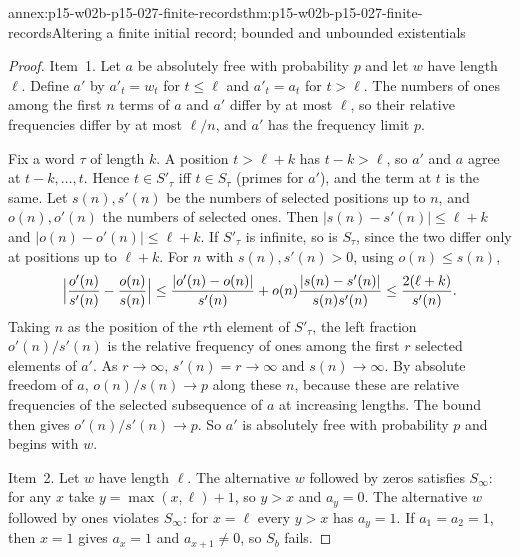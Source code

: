 \begin{annexitem}{annex:p15-w02b-p15-027-finite-records}{thm:p15-w02b-p15-027-finite-records}{Altering a finite initial record; bounded and unbounded existentials}
\begin{proof}
Item~1. Let \(a\) be absolutely free with probability \(p\) and let \(w\)
have length \(\ell\). Define \(a'\) by \(a'_t=w_t\) for \(t\leq\ell\) and
\(a'_t=a_t\) for \(t>\ell\). The numbers of ones among the first \(n\)
terms of \(a\) and \(a'\) differ by at most \(\ell\), so their relative
frequencies differ by at most \(\ell/n\), and \(a'\) has the frequency
limit \(p\).

Fix a word \(\tau\) of length \(k\). A position \(t>\ell+k\) has
\(t-k>\ell\), so \(a'\) and \(a\) agree at \(t-k,\ldots,t\). Hence
\(t\in S'_\tau\) iff \(t\in S_\tau\) (primes for \(a'\)), and the term at
\(t\) is the same. Let \(s(n),s'(n)\) be the numbers of selected
positions up to \(n\), and \(o(n),o'(n)\) the numbers of selected ones.
Then \(|s(n)-s'(n)|\leq\ell+k\) and \(|o(n)-o'(n)|\leq\ell+k\). If
\(S'_\tau\) is infinite, so is \(S_\tau\), since the two differ only at
positions up to \(\ell+k\). For \(n\) with \(s(n),s'(n)>0\), using
\(o(n)\leq s(n)\),
\[
 \Bigl|\frac{o'(n)}{s'(n)}-\frac{o(n)}{s(n)}\Bigr|
 \leq\frac{|o'(n)-o(n)|}{s'(n)}+o(n)\frac{|s(n)-s'(n)|}{s(n)s'(n)}
 \leq\frac{2(\ell+k)}{s'(n)} .
\]
Taking \(n\) as the position of the \(r\)th element of \(S'_\tau\), the
left fraction \(o'(n)/s'(n)\) is the relative frequency of ones among the
first \(r\) selected elements of \(a'\). As \(r\to\infty\), \(s'(n)=r\to\infty\)
and \(s(n)\to\infty\). By absolute freedom of \(a\),
\(o(n)/s(n)\to p\) along these \(n\), because these are relative
frequencies of the selected subsequence of \(a\) at increasing lengths.
The bound then gives \(o'(n)/s'(n)\to p\). So \(a'\) is absolutely free
with probability \(p\) and begins with \(w\).

Item~2. Let \(w\) have length \(\ell\). The alternative \(w\) followed
by zeros satisfies \(S_\infty\): for any \(x\) take
\(y=\max(x,\ell)+1\), so \(y>x\) and \(a_y=0\). The alternative \(w\)
followed by ones violates \(S_\infty\): for \(x=\ell\) every \(y>x\)
has \(a_y=1\). If \(a_1=a_2=1\), then \(x=1\) gives \(a_x=1\) and
\(a_{x+1}\neq0\), so \(S_b\) fails.
\end{proof}
\end{annexitem}


